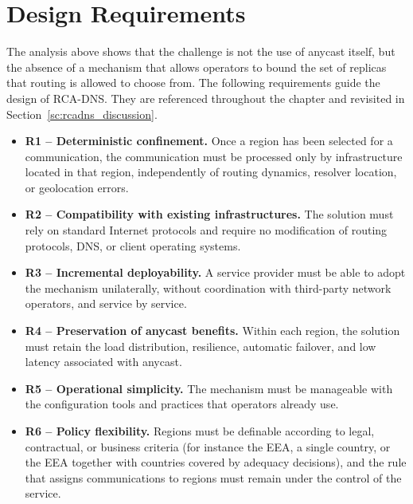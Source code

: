\documentclass[
A4paper,                %
twoside,                %
openright,              %
chapterprefix=true,     %
12pt,                   %
headings=normal,        %
titlepage=on            %
]{book}
\begin{document}
\section{Design Requirements}
\label{sc:rcadns_requirements}

The analysis above shows that the challenge is not the use of anycast itself, but the absence of a mechanism that allows operators to bound the set of replicas that routing is allowed to choose from. The following requirements guide the design of RCA-DNS. They are referenced throughout the chapter and revisited in Section~\ref{sc:rcadns_discussion}.

\begin{itemize}
    \item \textbf{R1 -- Deterministic confinement.} Once a region has been selected for a communication, the communication must be processed only by infrastructure located in that region, independently of routing dynamics, resolver location, or geolocation errors.

    \item \textbf{R2 -- Compatibility with existing infrastructures.} The solution must rely on standard Internet protocols and require no modification of routing protocols, DNS, or client operating systems.

    \item \textbf{R3 -- Incremental deployability.} A service provider must be able to adopt the mechanism unilaterally, without coordination with third-party network operators, and service by service.

    \item \textbf{R4 -- Preservation of anycast benefits.} Within each region, the solution must retain the load distribution, resilience, automatic failover, and low latency associated with anycast.

    \item \textbf{R5 -- Operational simplicity.} The mechanism must be manageable with the configuration tools and practices that operators already use.

    \item \textbf{R6 -- Policy flexibility.} Regions must be definable according to legal, contractual, or business criteria (for instance the EEA, a single country, or the EEA together with countries covered by adequacy decisions), and the rule that assigns communications to regions must remain under the control of the service.
\end{itemize}
\end{document}
